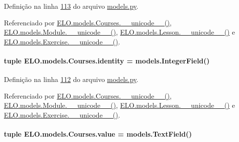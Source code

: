 Definição na linha \hyperlink{ELO_2models_8py_source_l00113}{113} do arquivo \hyperlink{ELO_2models_8py_source}{models.\-py}.



Referenciado por \hyperlink{classELO_1_1models_1_1Courses_a8926a37152be8d4fc3e0ba6af200f871}{E\-L\-O.\-models.\-Courses.\-\_\-\-\_\-unicode\-\_\-\-\_\-()}, \hyperlink{classELO_1_1models_1_1Module_a1b54aa7a5e8dac090dea0926eca5550d}{E\-L\-O.\-models.\-Module.\-\_\-\-\_\-unicode\-\_\-\-\_\-()}, \hyperlink{classELO_1_1models_1_1Lesson_a3d9f0295dbe1ed5c74668d6c0876f97c}{E\-L\-O.\-models.\-Lesson.\-\_\-\-\_\-unicode\-\_\-\-\_\-()} e \hyperlink{classELO_1_1models_1_1Exercise_af3e991e5610cec815a2c3260ec6aae0b}{E\-L\-O.\-models.\-Exercise.\-\_\-\-\_\-unicode\-\_\-\-\_\-()}.

\hypertarget{classELO_1_1models_1_1Courses_a83d1bd0bc45319f3b88446f87f42a03e}{
\paragraph[{identity}]{\setlength{\rightskip}{0pt plus 5cm}tuple E\-L\-O.\-models.\-Courses.\-identity = models.\-Integer\-Field()\hspace{0.3cm}{\ttfamily [static]}}}\label{classELO_1_1models_1_1Courses_a83d1bd0bc45319f3b88446f87f42a03e}


Definição na linha \hyperlink{ELO_2models_8py_source_l00112}{112} do arquivo \hyperlink{ELO_2models_8py_source}{models.\-py}.



Referenciado por \hyperlink{classELO_1_1models_1_1Courses_a8926a37152be8d4fc3e0ba6af200f871}{E\-L\-O.\-models.\-Courses.\-\_\-\-\_\-unicode\-\_\-\-\_\-()}, \hyperlink{classELO_1_1models_1_1Module_a1b54aa7a5e8dac090dea0926eca5550d}{E\-L\-O.\-models.\-Module.\-\_\-\-\_\-unicode\-\_\-\-\_\-()}, \hyperlink{classELO_1_1models_1_1Lesson_a3d9f0295dbe1ed5c74668d6c0876f97c}{E\-L\-O.\-models.\-Lesson.\-\_\-\-\_\-unicode\-\_\-\-\_\-()} e \hyperlink{classELO_1_1models_1_1Exercise_af3e991e5610cec815a2c3260ec6aae0b}{E\-L\-O.\-models.\-Exercise.\-\_\-\-\_\-unicode\-\_\-\-\_\-()}.

\hypertarget{classELO_1_1models_1_1Courses_a2b3c228ef67c767570b3555b3b7f1de2}{
\paragraph[{value}]{\setlength{\rightskip}{0pt plus 5cm}tuple E\-L\-O.\-models.\-Courses.\-value = models.\-Text\-Field()\hspace{0.3cm}{\ttfamily [static]}}}\label{classELO_1_1models_1_1Courses_a2b3c228ef67c767570b3555b3b7f1de2}


